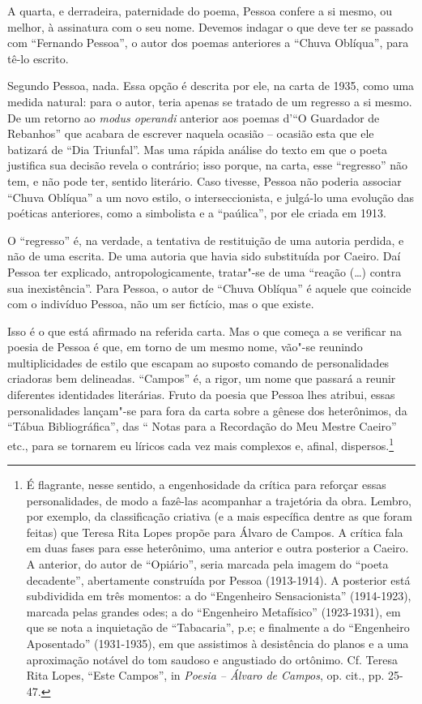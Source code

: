 A quarta, e derradeira, paternidade do poema, Pessoa confere a si mesmo,
ou melhor, à assinatura com o seu nome. Devemos indagar o que deve ter
se passado com ``Fernando Pessoa'', o autor dos poemas anteriores a
``Chuva Oblíqua'', para tê-lo escrito.

Segundo Pessoa, nada. Essa opção é descrita por ele, na carta de 1935,
como uma medida natural: para o autor, teria apenas se tratado de um
regresso a si mesmo. De um retorno ao \emph{modus operandi} anterior aos
poemas d'``O Guardador de Rebanhos'' que acabara de escrever naquela
ocasião -- ocasião esta que ele batizará de ``Dia Triunfal''. Mas uma
rápida análise do texto em que o poeta justifica sua decisão revela o
contrário; isso porque, na carta, esse ``regresso'' não tem, e não pode
ter, sentido literário. Caso tivesse, Pessoa não poderia associar
``Chuva Oblíqua'' a um novo estilo, o interseccionista, e julgá-lo uma
evolução das poéticas anteriores, como a simbolista e a ``paúlica'', por
ele criada em 1913.

O ``regresso'' é, na verdade, a tentativa de restituição de uma autoria
perdida, e não de uma escrita. De uma autoria que havia sido substituída
por Caeiro. Daí Pessoa ter explicado, antropologicamente, tratar"-se de
uma ``reação (\ldots{}) contra sua inexistência''. Para Pessoa, o autor de
``Chuva Oblíqua'' é aquele que coincide com o indivíduo Pessoa, não um
ser fictício, mas o que existe.

Isso é o que está afirmado na referida carta. Mas o que começa a se
verificar na poesia de Pessoa é que, em torno de um mesmo nome, vão"-se
reunindo multiplicidades de estilo que escapam ao suposto comando de
personalidades criadoras bem delineadas. ``Campos'' é, a rigor, um nome
que passará a reunir diferentes identidades literárias. Fruto da poesia
que Pessoa lhes atribui, essas personalidades lançam"-se para fora da
carta sobre a gênese dos heterônimos, da ``Tábua Bibliográfica'', das ``
Notas para a Recordação do Meu Mestre Caeiro'' etc., para se tornarem eu
líricos cada vez mais complexos e, afinal, dispersos.\footnote{É
  flagrante, nesse sentido, a engenhosidade da crítica para reforçar
  essas personalidades, de modo a fazê-las acompanhar a trajetória da
  obra. Lembro, por exemplo, da classificação criativa (e a mais
  específica dentre as que foram feitas) que Teresa Rita Lopes propõe
  para Álvaro de Campos. A crítica fala em duas fases para esse
  heterônimo, uma anterior e outra posterior a Caeiro. A anterior, do
  autor de ``Opiário'', seria marcada pela imagem do ``poeta
  decadente'', abertamente construída por Pessoa (1913-1914). A
  posterior está subdividida em três momentos: a do ``Engenheiro
  Sensacionista'' (1914-1923), marcada pelas grandes odes; a do
  ``Engenheiro Metafísico'' (1923-1931), em que se nota a inquietação de
  ``Tabacaria'', p.e; e finalmente a do ``Engenheiro Aposentado''
  (1931-1935), em que assistimos à desistência do planos e a uma
  aproximação notável do tom saudoso e angustiado do ortônimo. Cf.
  Teresa Rita Lopes, ``Este Campos'', in \emph{Poesia -- Álvaro de
  Campos}, op. cit., pp. 25-47.}

